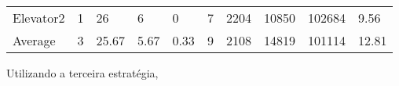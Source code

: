﻿\documentclass[a4paper]{article}
\begin{document}
\begin{table}[h]
\begin{tabular}{@{}llllllllll@{}}
Elevator2 & 1        & 26            & 6           & 0                                                               & 7                                                                  & 2204                                                         & 10850                                                 & 102684                                                   & 9.56         \\
Average   & 3     & 25.67         & 5.67        & 0.33                                                               & 9                                                               & 2108                                                         & 14819                                                 & 101114                                                   &  12.81         \\ \bottomrule
\end{tabular}
\end{table}

Utilizando a terceira estratégia,
\end{document}

